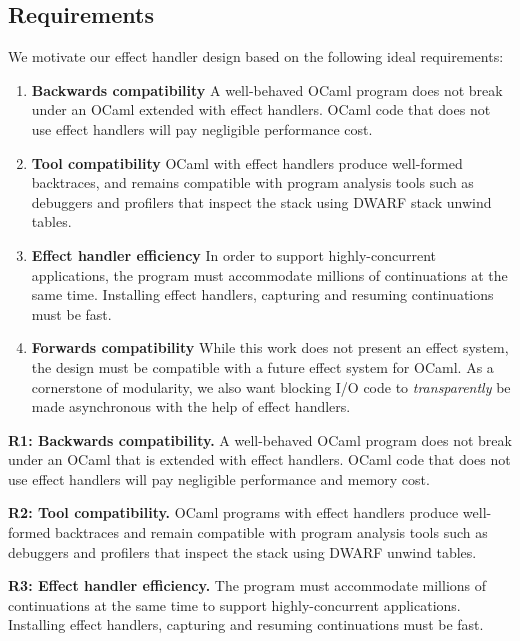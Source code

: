 \documentclass[sigplan,10pt,review,anonymous]{acmart}\settopmatter{printfolios=true,printccs=false,printacmref=false}
\begin{document}
\subsection{Requirements}
\label{sec:req}

We motivate our effect handler design based on the following ideal
requirements:

\begin{enumerate}[label=R\arabic*]
  \item \textbf{Backwards compatibility} A well-behaved OCaml program does not
    break under an OCaml extended with effect handlers. OCaml code that does not
    use effect handlers will pay negligible performance cost.
  \item \textbf{Tool compatibility} OCaml with effect handlers produce
    well-formed backtraces, and remains compatible with program analysis tools
    such as debuggers and profilers that inspect the stack using DWARF stack
    unwind tables.
  \item \textbf{Effect handler efficiency} In order to support
    highly-concurrent applications, the program must accommodate millions of
    continuations at the same time. Installing effect handlers, capturing and
    resuming continuations must be fast.
  \item \textbf{Forwards compatibility} While this work does not present an
    effect system, the design must be compatible with a future effect system
    for OCaml. As a cornerstone of modularity, we also want blocking I/O code
    to \emph{transparently} be made asynchronous with the help of effect
    handlers.
\end{enumerate}
\fi

\noindent \textbf{R1: Backwards compatibility.} A well-behaved OCaml program does
not break under an OCaml that is extended with effect handlers. OCaml code that does not
use effect handlers will pay negligible performance and memory cost.

\noindent \textbf{R2: Tool compatibility.} OCaml programs with effect handlers produce
well-formed backtraces and remain compatible with program analysis tools such
as debuggers and profilers that inspect the stack using DWARF unwind
tables.

\noindent \textbf{R3: Effect handler efficiency.} The program must accommodate millions of
continuations at the same time to support
highly-concurrent applications. Installing effect handlers, capturing and
resuming continuations must be fast.
\end{document}

